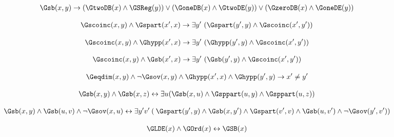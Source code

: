 \begin{erin}
    \begin{align*}
        \Gsb(x,y) \to (\GtwoDB(x) \wedge \GSReg(y)) \vee (\GoneDB(x) \wedge \GtwoDE(y)) \vee (\GzeroDB(x) \wedge \GoneDE(y))
    \end{align*}
\end{erin}

\begin{erin}
    \begin{align*}
        \Gscoinc(x,y) \wedge \Gspart(x',x) \to \exists y' \ (\Gspart(y',y) \wedge \Gscoinc(x',y'))
    \end{align*}
\end{erin}

\begin{erin}
    \begin{align*}
        \Gscoinc(x,y) \wedge \Ghypp(x',x) \to \exists y' \ (\Ghypp(y',y) \wedge \Gscoinc(x',y'))
    \end{align*}
\end{erin}

\begin{erin}
    \begin{align*}
        \Gscoinc(x,y) \wedge \Gsb(x',x) \to \exists y' \ (\Gsb(y',y) \wedge \Gscoinc(x',y'))
    \end{align*}
\end{erin}

\begin{erin}[A30.]
    \begin{align*}
        \Geqdim(x,y) \wedge \neg\Gsov(x,y) \wedge \Ghypp(x',x) \wedge \Ghypp(y',y) \to x' \neq y'
    \end{align*}
\end{erin}
                
\begin{erin}
    \begin{align*}
        \Gsb(x,y) \wedge \Gsb(x,z) \leftrightarrow \exists u (\Gsb(x,u) \land \Gsppart(u,y) \land \Gsppart(u,z))
    \end{align*}
\end{erin}

\begin{erin}[A32'.]
    \begin{align*}
        \Gsb(x,y) \land \Gsb(u,v) \land \neg \Gsov(x,u) \leftrightarrow \exists y'v'\:(\: \Gspart(y',y) \land \Gsb(x,y') \land \Gspart(v',v) \land \Gsb(u,v') \land \neg \Gsov(y',v'))
    \end{align*}
\end{erin}

\begin{erin}
    \begin{align*}
        \GLDE(x) \land \GOrd(x) \leftrightarrow \GSB(x)
    \end{align*}
\end{erin}
